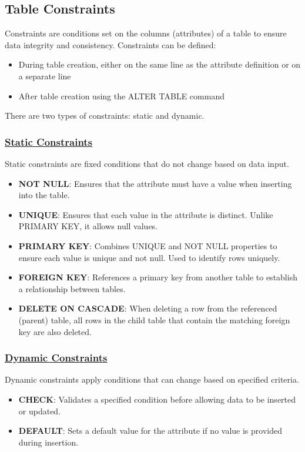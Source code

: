 \subsection{Table Constraints}
\begin{tcolorbox}[title = Definition]
Constraints are conditions set on the columns (attributes) of a table to ensure data integrity and consistency. Constraints can be defined:
\begin{itemize}
    \item During table creation, either on the same line as the attribute definition or on a separate line
    \item After table creation using the ALTER TABLE command
\end{itemize}

There are two types of constraints: static and dynamic.
\subsubsection*{\underline{Static Constraints}} Static constraints are fixed conditions that do not change based on data input.

\begin{itemize} 
\item \textbf{NOT NULL}: Ensures that the attribute must have a value when inserting into the table.
\item \textbf{UNIQUE}: Ensures that each value in the attribute is distinct. Unlike PRIMARY KEY, it allows null values.
\item \textbf{PRIMARY KEY}: Combines UNIQUE and NOT NULL properties to ensure each value is unique and not null.
Used to identify rows uniquely. 
\item \textbf{FOREIGN KEY}: References a primary key from another table to establish a relationship between tables.
\item \textbf{DELETE ON CASCADE}: When deleting a row from the referenced (parent) table, all rows in the child table 
that contain the matching foreign key are also deleted.
\end{itemize}
\subsubsection*{\underline{Dynamic Constraints}} Dynamic constraints apply conditions that can change based on specified criteria.

\begin{itemize} 
\item \textbf{CHECK}: Validates a specified condition before allowing data to be inserted or updated. 
\item \textbf{DEFAULT}: Sets a default value for the attribute if no value is provided during insertion. 
\end{itemize}
\end{tcolorbox}
